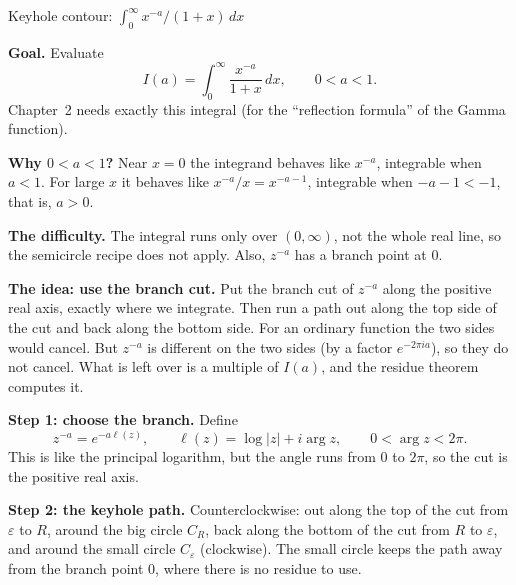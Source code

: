 \documentclass[11pt]{beamer}
\begin{document}
\begin{frame}[allowframebreaks=1.00]{Keyhole contour: $\int_0^\infty x^{-a}/(1+x)\,dx$}
\footnotesize

\textbf{Goal.} Evaluate
\[
 I(a)=\int_0^\infty\frac{x^{-a}}{1+x}\,dx,
 \qquad 0<a<1.
\]
Chapter~2 needs exactly this integral (for the ``reflection formula'' of the Gamma function).

\textbf{Why \(0<a<1\)?} Near \(x=0\) the integrand behaves like \(x^{-a}\), integrable when \(a<1\). For
large \(x\) it behaves like \(x^{-a}/x=x^{-a-1}\), integrable when \(-a-1<-1\), that is, \(a>0\).

\textbf{The difficulty.} The integral runs only over \((0,\infty)\), not the whole real line, so the
semicircle recipe does not apply. Also, \(z^{-a}\) has a branch point at \(0\).

\textbf{The idea: use the branch cut.} Put the branch cut of \(z^{-a}\) along the positive real axis,
exactly where we integrate. Then run a path out along the top side of the cut and back along the
bottom side. For an ordinary function the two sides would cancel. But \(z^{-a}\) is different on the
two sides (by a factor \(e^{-2\pi ia}\)), so they do not cancel. What is left over is a multiple of
\(I(a)\), and the residue theorem computes it.
\par\framebreak\par
\textbf{Step 1: choose the branch.} Define
\[
 z^{-a}=e^{-a\ell(z)},\qquad
 \ell(z)=\log|z|+i\arg z,\qquad 0<\arg z<2\pi .
\]
This is like the principal logarithm, but the angle runs from \(0\) to \(2\pi\), so the cut is the
positive real axis.

\textbf{Step 2: the keyhole path.} Counterclockwise: out along the top of the cut from \(\varepsilon\) to
\(R\), around the big circle \(C_R\), back along the bottom of the cut from \(R\) to \(\varepsilon\), and around
the small circle \(C_\varepsilon\) (clockwise). The small circle keeps the path away from the branch point
\(0\), where there is no residue to use.


\end{frame}
\end{document}
